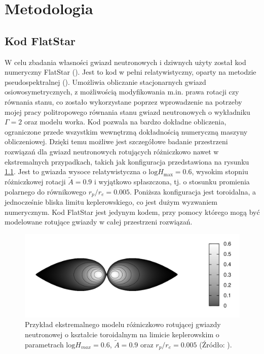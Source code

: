 \documentclass{bachelor_thesis}
\begin{document}
    \chapter{Metodologia}
        \section{Kod FlatStar}
        W celu zbadania własności gwiazd neutronowych i dziwnych użyty został kod numeryczny FlatStar (\cite{Ansorg2009}). Jest to kod w pełni relatywistyczny, oparty na metodzie pseudospektralnej (\citealp{Bonazzola1993}). Umożliwia obliczanie stacjonarnych gwiazd osiowosymetrycznych, z możliwością modyfikowania m.in. prawa rotacji czy równania stanu, co zostało wykorzystane poprzez wprowadzenie na potrzeby mojej pracy politropowego równania stanu gwiazd neutronowych o wykładniku $\Gamma=2$ oraz modelu worka. Kod pozwala na bardzo dokładne obliczenia, ograniczone przede wszystkim wewnętrzną dokładnością numeryczną maszyny obliczeniowej. Dzięki temu możliwe jest szczegółowe badanie przestrzeni rozwiązań dla gwiazd neutronowych rotujących różniczkowo nawet w ekstremalnych przypadkach, takich jak konfiguracja przedstawiona na rysunku \ref{RysKot}. Jest to gwiazda wysoce relatywistyczna o $\textrm{log}H_{\textrm{max}}=0.6$, wysokim stopniu różniczkowej rotacji $\tilde{A}=0.9$ i wyjątkowo spłaszczona, tj. o stosunku promienia polarnego do równikowego $r_p/r_e=0.005$. Poniższa konfiguracja jest toroidalna, a jednocześnie bliska limitu keplerowskiego, co jest dużym wyzwaniem numerycznym. Kod FlatStar jest jedynym kodem, przy pomocy którego mogą być modelowane rotujące gwiazdy w całej przestrzeni rozwiązań.
        \begin{figure}[h!]
            \centering
            \includegraphics[scale=.33]{figures/RysKot.png}
            \caption{Przykład ekstremalnego modelu różniczkowo rotującej gwiazdy neutronowej o kształcie toroidalnym na limicie keplerowskim o parametrach $\textrm{log}H_{max}=0.6$, $\tilde{A}=0.9$ oraz $r_p/r_e=0.005$ (Źródło: \citealp{Ansorg2009}).}
            \label{RysKot}
        \end{figure}\\
\end{document}
